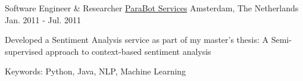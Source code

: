 \begin{cventries}
  \cventry
    {Software Engineer \& Researcher} %
    {\href{http://www.parabots.nl//}{ParaBot Services}} %
    {Amsterdam, The Netherlands} %
    {Jan. 2011 - Jul. 2011} %
    {
      \begin{cvitems} %
        \item {Developed a Sentiment Analysis service as part of my master's thesis: A Semi-supervised approach to context-based sentiment analysis}
        \item {Keywords: Python, Java, NLP, Machine Learning}
      \end{cvitems}
    }
\end{cventries}
